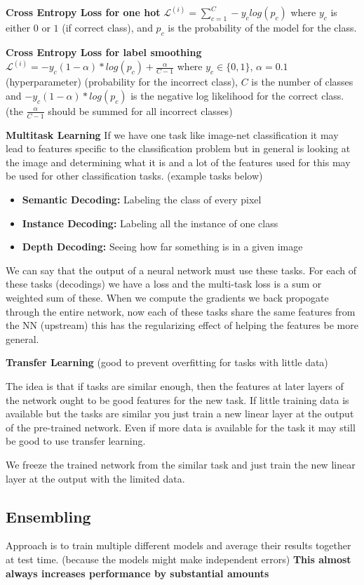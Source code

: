 \documentclass[twocolumn, letter, 10pt, landscape]{article}
\newcommand{\tb}{\textbf}
\newcommand{\bit}{\vspace{-0.1in}\begin{itemize}\setlength\itemsep{-0.05in}}
\newcommand{\eit}{\end{itemize}\vspace{-0.1in}}
\newcommand{\mal}{\mathcal{L}}
\begin{document}
\tb{Cross Entropy Loss for one hot} $\mal^{(i)}=\sum_{c=1}^C-y_clog(p_c)$ where $y_c$ is either $0$ or $1$ (if correct class), and $p_c$ is the probability of the model for the class.

\tb{Cross Entropy Loss for label smoothing} $\mal^{(i)}=-y_c(1-\alpha)*log(p_c)+\frac{\alpha}{C-1}$ where $y_c\in\{0,1\}$, $\alpha = 0.1$ (hyperparameter) (probability for the incorrect class), $C$ is the number of classes and $-y_c(1-\alpha)*log(p_c)$ is the negative log likelihood for the correct class. (the $\frac{\alpha}{C-1}$ should be summed for all incorrect classes)

\tb{Multitask Learning}
If we have one task like image-net classification it may lead to features specific to the classification problem but in general is looking at the image and determining what it is and a lot of the features used for this may be used for other classification tasks. (example tasks below)

\bit{}
\item \tb{Semantic Decoding:} Labeling the class of every pixel
\item \tb{Instance Decoding:} Labeling all the instance of one class
\item \tb{Depth Decoding:} Seeing how far something is in a given image
\eit{}

We can say that the output of a neural network must use these tasks. For each of these tasks (decodings) we have a loss and the multi-task loss is a sum or weighted sum of these. When we compute the gradients we back propogate through the entire network, now each of these tasks share the same features from the NN (upstream) this has the regularizing effect of helping the features be more general.

\tb{Transfer Learning} (good to prevent overfitting for tasks with little data)

The idea is that if tasks are similar enough, then the features at later layers of the network ought to be good features for the new task. If little training data is available but the tasks are similar you just train a new linear layer at the output of the pre-trained network. Even if more data is available for the task it may still be good to use transfer learning.

We freeze the trained network from the similar task and just train the new linear layer at the output with the limited data.

\subsection{Ensembling}
Approach is to train multiple different models and average their results together at test time. (because the models might make independent errors)
\tb{This almost always increases performance by substantial amounts}
\end{document}
